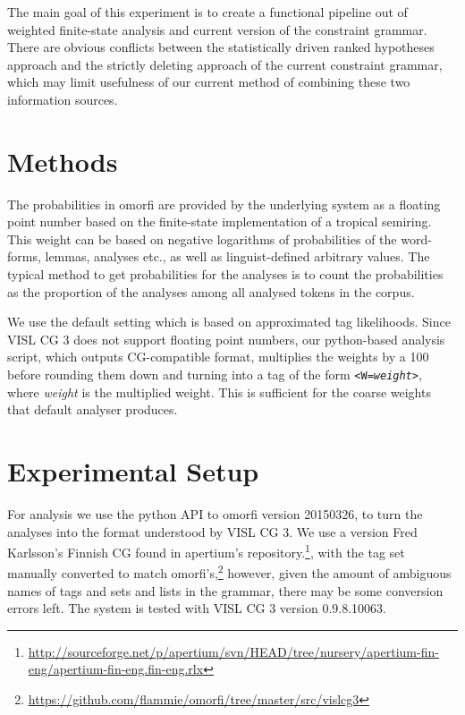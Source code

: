 \documentclass[11pt]{article}
\begin{document}
The main goal of this experiment is to create a functional
pipeline out of weighted finite-state analysis and current version of the
constraint grammar. There are obvious conflicts between the statistically
driven ranked hypotheses approach and the strictly deleting approach of the
current constraint grammar, which may limit usefulness of our current method
of combining these two information sources. 

\section{Methods}

The probabilities in omorfi are provided by the underlying system as a floating
point number based on the finite-state implementation of a tropical semiring.
This weight can be based on negative logarithms of probabilities of the
word-forms, lemmas, analyses etc., as well as linguist-defined arbitrary
values. The typical method to get probabilities for the analyses is to
count the probabilities as the proportion of the analyses among all analysed
tokens in the corpus. 

We use the default
setting which is based on approximated tag likelihoods. Since VISL CG 3 does
not support floating point numbers, our python-based analysis script, which
outputs CG-compatible format, multiplies the weights by a 100 before rounding
them down and turning into a tag of the form \texttt{<W=\emph{weight}>}, where
\emph{weight} is the multiplied weight. This is sufficient for the
coarse weights that default analyser produces.

\section{Experimental Setup}

For analysis we use the python API to omorfi version 20150326, to turn the
analyses into the format understood by VISL CG 3. We use a version Fred
Karlsson's Finnish CG found in apertium's
repository.\footnote{\url{http://sourceforge.net/p/apertium/svn/HEAD/tree/nursery/apertium-fin-eng/apertium-fin-eng.fin-eng.rlx}},
with the tag set manually converted to match
omorfi's,\footnote{\url{https://github.com/flammie/omorfi/tree/master/src/vislcg3}}
however, given the amount of ambiguous names of tags and sets and lists in the
grammar, there may be some conversion errors left.  The system is tested with
VISL CG 3 version 0.9.8.10063.
\end{document}
